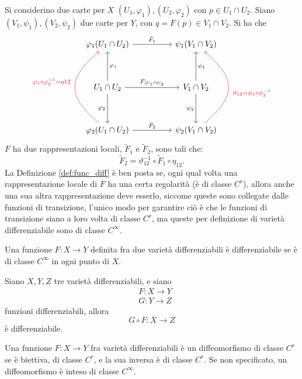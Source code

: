 \documentclass[10pt, letterpaper]{report}
\begin{document}
Si considerino due carte per $X$ $(U_1,\varphi_1),(U_2,\varphi_2)$ con $p\in U_1\cap U_2$. Siano $(V_1,\psi_1),(V_2,\psi_2)$ due carte per $Y$, con $q=F(p)\in V_1\cap V_2$. Si ha che
\[
\begin{tikzcd}[column sep=huge, row sep=huge]
\varphi_1(U_1 \cap U_2) \arrow[r, "\tilde F_1"] & \psi_1(V_1 \cap V_2) \\
U_1 \cap U_2\arrow[u, "\varphi_1"'] \arrow[d, "\varphi_2"'] \arrow[r, "F_{|U_1 \cap U_2}"] & V_1 \cap V_2 \arrow[d, "\psi_2"']\arrow[u, "\psi_1"']  \\
\varphi_2(U_1 \cap U_2) \arrow[r, "\tilde{F}_2"] & \psi_2(V_1 \cap V_2)
\arrow[from=3-1, to=1-1, bend left=50, looseness=1.5, "\varphi_1 \circ \varphi_2^{-1} = \eta{12}"{above, xshift=-1cm}, red]
\arrow[from=3-2, to=1-2, bend right=50, looseness=1.5, "\vartheta_{12} = \psi_1 \circ \psi_2^{-1}"{below, xshift=1cm}, red]
\end{tikzcd}
\]
$F$ ha due rappresentazioni locali, $\tilde F_1$ e $\tilde F_2$, sono tali che:\begin{equation}
    \tilde F_2=\vartheta_{12}^{-1}\circ\tilde F_1\circ\eta_{12}.
\end{equation}
La Definizione \ref{def:func_diff} è ben posta se, ogni qual volta una rappresentazione locale di $F$ ha una certa regolarità (è di classe $C^r$), allora anche una sua altra rappresentazione deve esserlo, siccome queste sono collegate dalle funzioni di transizione, l'unico modo per garantire ciò è che le funzioni di transizione siano a loro volta di classe $C^r$, ma queste per definizione di varietà differenziabile sono di classe $C^\infty$.\begin{definizione}
    Una funzione $F:X\rightarrow Y$ definita fra due varietà differenziabili è differenziabile se è di classe $C^\infty$ in ogni punto di $X$.
\end{definizione}
\begin{proposizione}
Siano $X,Y,Z$ tre varietà differenziabili, e siano \begin{align}
    &F:X\rightarrow Y\\ 
    &G:Y\rightarrow Z
\end{align}
funzioni differenziabili, allora\begin{equation}
    G\circ F:X\rightarrow Z 
\end{equation}
è differenziabile.
\end{proposizione}
\begin{definizione}
    Una funzione $F:X\rightarrow Y$
 fra varietà differenziabili è un diffeomorfismo di classe $C^r$ se è biettiva, di classe $C^r$, e la sua inversa è di classe $C^r$. Se non specificato, un diffeomorfismo è inteso di classe $C^\infty$. \end{definizione}
\end{document}
